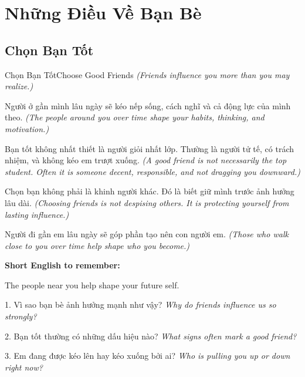 \chapter{Những Điều Về Bạn Bè}

\section{Chọn Bạn Tốt}
\begin{truyen}{Chọn Bạn Tốt}{Choose Good Friends}
\textit{(Friends influence you more than you may realize.)}

Người ở gần mình lâu ngày sẽ kéo nếp sống, cách nghĩ và cả động lực của mình theo.
\textit{(The people around you over time shape your habits, thinking, and motivation.)}

Bạn tốt không nhất thiết là người giỏi nhất lớp. Thường là người tử tế, có trách nhiệm, và không kéo em trượt xuống.
\textit{(A good friend is not necessarily the top student. Often it is someone decent, responsible, and not dragging you downward.)}

Chọn bạn không phải là khinh người khác. Đó là biết giữ mình trước ảnh hưởng lâu dài.
\textit{(Choosing friends is not despising others. It is protecting yourself from lasting influence.)}
\end{truyen}

\begin{baihoc}
Người đi gần em lâu ngày sẽ góp phần tạo nên con người em.
\textit{(Those who walk close to you over time help shape who you become.)}
\end{baihoc}

\begin{ghinhoanh}
\textbf{Short English to remember:}

The people near you help shape your future self.

\end{ghinhoanh}

\begin{tuhocnhanh}
1. Vì sao bạn bè ảnh hưởng mạnh như vậy? \textit{Why do friends influence us so strongly?}

2. Bạn tốt thường có những dấu hiệu nào? \textit{What signs often mark a good friend?}

3. Em đang được kéo lên hay kéo xuống bởi ai? \textit{Who is pulling you up or down right now?}
\end{tuhocnhanh}
\ngancach

